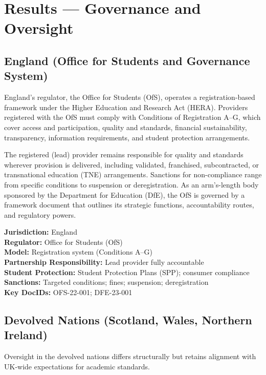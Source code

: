 \section{Results — Governance and Oversight}

\subsection{England (Office for Students and Governance System)}

England’s regulator, the Office for Students (OfS), operates a registration-based framework
under the Higher Education and Research Act (HERA). Providers registered with the OfS must
comply with Conditions of Registration A--G, which cover access and participation, quality
and standards, financial sustainability, transparency, information requirements, and student
protection arrangements. 

The registered (lead) provider remains responsible for quality and standards wherever
provision is delivered, including validated, franchised, subcontracted, or transnational
education (TNE) arrangements. Sanctions for non-compliance range from specific conditions to
suspension or deregistration. As an arm’s-length body sponsored by the Department for
Education (DfE), the OfS is governed by a framework document that outlines its strategic
functions, accountability routes, and regulatory powers.

\begin{tcolorbox}
\textbf{Jurisdiction:} England \\
\textbf{Regulator:} Office for Students (OfS) \\
\textbf{Model:} Registration system (Conditions A--G) \\
\textbf{Partnership Responsibility:} Lead provider fully accountable \\
\textbf{Student Protection:} Student Protection Plans (SPP); consumer compliance \\
\textbf{Sanctions:} Targeted conditions; fines; suspension; deregistration \\
\textbf{Key DocIDs:} OFS-22-001; DFE-23-001
\end{tcolorbox}

\subsection{Devolved Nations (Scotland, Wales, Northern Ireland)}

Oversight in the devolved nations differs structurally but retains alignment with UK-wide
expectations for academic standards.

